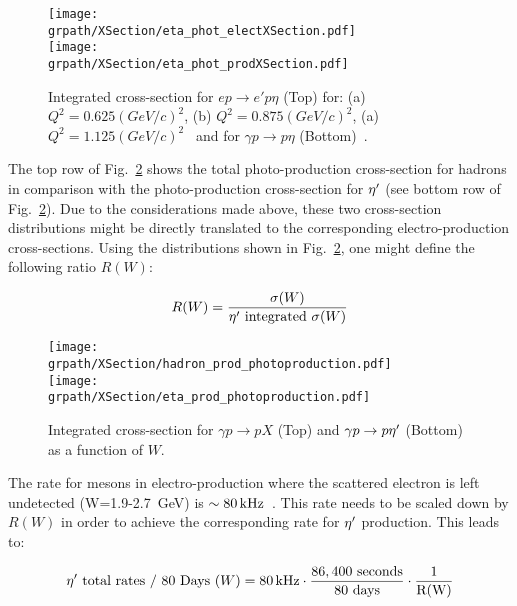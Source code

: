 \begin{figure}[htbp]\begin{center}
		\texttt{[image: \\grpath/XSection/eta\_phot\_electXSection.pdf]}\\
		\texttt{[image: \\grpath/XSection/eta\_phot\_prodXSection.pdf]}
		\caption[eta el-prod. XSection]{\label{fig:EtaProdX}{Integrated cross-section for $ep\to e'p\eta$ (Top) for: (a) $Q^2=0.625(GeV/c)^2$, (b) $Q^2=0.875(GeV/c)^2$, (a) $Q^2=1.125(GeV/c)^2$~\cite{etaelect} and for $\gamma p\rightarrow p\eta$ (Bottom)~\cite{etaphoto}.}}
\end{center}\end{figure}

\FloatBarrier

The top row of Fig.~\ref{fig:EtaPProdX} shows the total photo-production cross-section for hadrons in comparison with the photo-production cross-section for $\eta^{\prime}$ (see bottom row of Fig.~\ref{fig:EtaPProdX}). Due to the considerations made above, these two cross-section distributions might be directly translated to the corresponding electro-production cross-sections. Using the distributions shown in Fig.~\ref{fig:EtaPProdX}, one might define the following ratio $R(W)$:

\begin{equation}
 R(W) = \frac{\sigma(W)}{\eta^{\prime}\text{ integrated } \sigma(W)}
\label{XsecR}
\end{equation}

\begin{figure}[h!]\begin{center}
		\texttt{[image: \\grpath/XSection/hadron\_prod\_photoproduction.pdf]}\\
		\texttt{[image: \\grpath/XSection/eta\_prod\_photoproduction.pdf]}
		\caption[etaP phot-prod. XSection]{\label{fig:EtaPProdX}{Integrated cross-section for $\gamma p\rightarrow pX$ (Top) and $\gamma p\rightarrow p\eta^{\prime}$ (Bottom) as a function of $W$.}}
\end{center}\end{figure}

The rate for mesons in electro-production where the scattered electron is left undetected (W=1.9-2.7~GeV) is $\sim 80\,\rm{kHz}$~\cite{Sargsyan}. This rate needs to be scaled down by $R(W)$ in order to achieve the corresponding rate for $\eta^{\prime}$ production. This leads to:

\begin{equation}
 \eta^{\prime}\text{ total rates / 80 Days }(W) = 80\,\rm{kHz}\cdot \frac{86,400\mathrm{\ seconds}}{\text{80 days}}\cdot \frac{1}{R(W)}
\label{etaPRate}
\end{equation}

